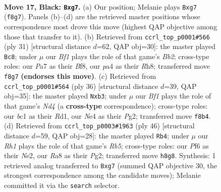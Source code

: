 \documentclass[11pt]{article}
\begin{document}
\clearpage

\begin{figure}[p]\centering
\begin{subfigure}{0.46\textwidth}\centering
\resizebox{\linewidth}{!}{%
\newchessgame
\chessboard[
  setfen={rk3b1r/pp4Pp/5p2/4pP2/P1P1n3/8/1P3P2/R1B1KB1R b KQ - 0 17},
  showmover=false,
  pgfstyle=straightmove, color=movearrow, markmove={f8-g7}
]}
\caption{}
\end{subfigure}\hfill
\begin{subfigure}{0.46\textwidth}\centering
\resizebox{\linewidth}{!}{%
\newchessgame
\chessboard[
  setfen={r3kb1r/1b3ppp/p3p3/N3n3/R3P3/4B1P1/1PP3P1/4KB1R b Kkq - 2 16},
  showmover=false,
  pgfstyle=straightmove, color=movearrow, markmove={b7-c8}
]}
\caption{}
\end{subfigure}
\\[4pt]
\begin{subfigure}{0.46\textwidth}\centering
\resizebox{\linewidth}{!}{%
\newchessgame
\chessboard[
  setfen={r1b4r/1p3p1p/1k3p2/1pb5/3N1B2/1pP5/P4PPP/R2R2K1 w - - 0 19},
  showmover=false,
  pgfstyle=straightmove, color=movearrow, markmove={d4-b3}
]}
\caption{}
\end{subfigure}\hfill
\begin{subfigure}{0.46\textwidth}\centering
\resizebox{\linewidth}{!}{%
\newchessgame
\chessboard[
  setfen={5rk1/p5pp/b4b2/1R6/2p1BP2/1P3K2/r1P1N1PP/7R w - - 1 24},
  showmover=false,
  pgfstyle=straightmove, color=movearrow, markmove={b5-b4}
]}
\caption{}
\end{subfigure}
\caption{\textbf{Move 17, Black: \texttt{Bxg7}.} (a) Our position; Melanie plays \texttt{Bxg7} (\texttt{f8g7}). Panels (b)--(d) are the retrieved master positions whose correspondence most drove this move (highest QAP objective among those that transfer to it). (b) Retrieved from \texttt{ccrl\_top\_p0001\#566} (ply 31) [structural distance $d$=62, QAP obj=30]: the master played \texttt{Bc8}; under $\mu$ our \emph{Bf1} plays the role of that game's \emph{Bb2}; cross-type roles: our \emph{P}a7 as their \emph{B}f8, our \emph{p}a4 as their \emph{R}h8; transferred move \texttt{f8g7} \textbf{(endorses this move)}. (c) Retrieved from \texttt{ccrl\_top\_p0001\#564} (ply 36) [structural distance $d$=39, QAP obj=35]: the master played \texttt{Nxb3}; under $\mu$ our \emph{Bf1} plays the role of that game's \emph{Nd4} (a \textbf{cross-type} correspondence); cross-type roles: our \emph{b}c1 as their \emph{R}d1, our \emph{N}e4 as their \emph{P}g2; transferred move \texttt{f8b4}. (d) Retrieved from \texttt{ccrl\_top\_p0003\#1963} (ply 46) [structural distance $d$=59, QAP obj=28]: the master played \texttt{Rb4}; under $\mu$ our \emph{Rh1} plays the role of that game's \emph{Rb5}; cross-type roles: our \emph{P}f6 as their \emph{N}e2, our \emph{R}a8 as their \emph{P}g2; transferred move \texttt{h8g8}. Synthesis: 1 retrieved analog transferred to \texttt{Bxg7} (summed QAP objective 30, the strongest correspondence among the candidate moves); Melanie committed it via the \texttt{search} selector.}
\label{fig:thought-m33}
\end{figure}
\end{document}
